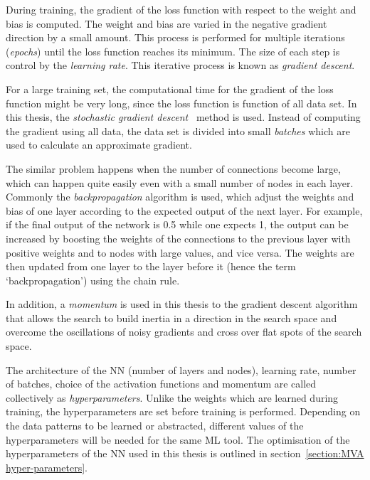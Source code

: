 During training, the gradient of the loss function with respect to the weight and bias
is computed. The weight and bias are varied in the negative gradient direction by a small amount. 
This process is performed for multiple iterations (\textit{epochs}) until the loss function reaches its minimum.
The size of each step is control by the \textit{learning rate}.
This iterative process is known as \textit{gradient descent}.

For a large training set, the computational time for the gradient of the loss function might be very long, 
since the loss function is function of all data set. 
In this thesis, the \textit{stochastic gradient descent}~\cite{Goodfellow-et-al-2016}
method is used. Instead of computing the gradient using all data, 
the data set is divided into small \textit{batches} 
which are used to calculate an approximate gradient.

The similar problem happens when the number of connections
become large, which can happen quite easily even with a small number of nodes in each layer.
Commonly the \textit{backpropagation} algorithm is used, which 
adjust the weights and bias of one layer according to the expected output of the next layer.
For example, if the final output of the network is 0.5 while 
one expects 1, the output can be increased by boosting the weights of the connections 
to the previous layer with positive weights and to nodes with large values, and vice versa.
The weights are then updated from one layer to the layer before it (hence the term `backpropagation')
using the chain rule.

In addition, a \textit{momentum} is used in this thesis to the gradient descent 
algorithm that allows the search to build inertia in a direction in the search space and overcome 
the oscillations of noisy gradients and cross over flat spots of the search space.


The architecture of the NN (number of layers and nodes), 
learning rate, number of batches, choice of the activation functions and momentum 
are called collectively as \textit{hyperparameters}.
Unlike the weights which are learned during training, 
the hyperparameters are set before training is performed.
Depending on the data patterns to be learned or abstracted,
different values of the hyperparameters will be needed for the same ML tool.
The optimisation of the hyperparameters of the NN used in this thesis
is outlined in section~\ref{section:MVA hyper-parameters}.
